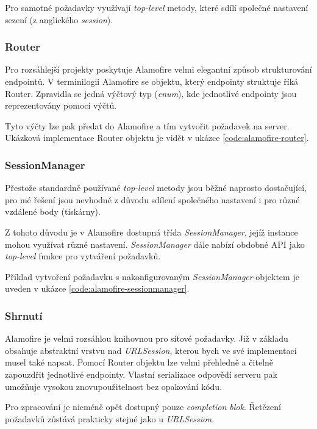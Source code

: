 Pro samotné požadavky využívají \textit{top-level} metody, které sdílí společné nastavení sezení (z anglického \textit{session}).

\subsubsection{Router}

Pro rozsáhlejší projekty poskytuje Alamofire velmi elegantní způsob strukturování endpointů.
V terminilogii Alamofire se objektu, který endpointy struktuje říká Router.
Zpravidla se jedná výčtový typ (\textit{enum}), kde jednotlivé endpointy jsou reprezentovány pomocí výčtů.

Tyto výčty lze pak předat do Alamofire a tím vytvořit požadavek na server.
Ukázková implementace Router objektu je vidět v ukázce \ref{code:alamofire-router}.


\subsubsection{SessionManager}

Přestože standardně používané \textit{top-level} metody jsou běžné naprosto dostačující, pro mé řešení jsou nevhodné z důvodu sdílení společného nastavení i pro různé vzdálené body (tiskárny).

Z tohoto důvodu je v Alamofire dostupná třída \textit{SessionManager}, jejíž instance mohou využívat různé nastavení.
\textit{SessionManager} dále nabízí obdobné API jako \textit{top-level} funkce pro vytváření požadavků.

Příklad vytvoření požadavku s nakonfigurovaným \textit{SessionManager} objektem je uveden v ukázce \ref{code:alamofire-sessionmanager}.


\subsubsection{Shrnutí}

Alamofire je velmi rozsáhlou knihovnou pro síťové požadavky.
Již v základu obsahuje abstraktní vrstvu nad \textit{URLSession}, kterou bych ve své implementaci musel také napsat.
Pomocí Router objektu lze velmi přehledně a čitelně zapouzdřit jednotlivé endpointy.
Vlastní serializace odpovědí serveru pak umožňuje vysokou znovupoužitelnost bez opakování kódu.

Pro zpracování je nicméně opět dostupný pouze \textit{completion blok}.
Řetězení požadavků zůstává prakticky stejné jako u \textit{URLSession}.
